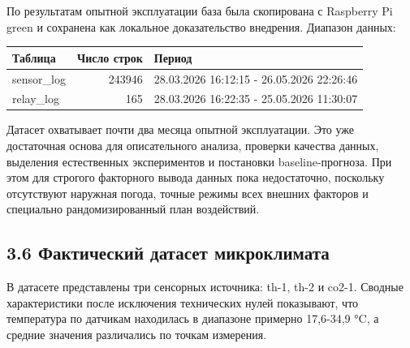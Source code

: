 \documentclass[a4paper,14pt]{extarticle}
\renewcommand{\texttt}[1]{\textnormal{#1}}
\newcounter{none}
\begin{document}
По результатам опытной эксплуатации база была скопирована с Raspberry Pi
\texttt{green} и сохранена как локальное доказательство внедрения.
Диапазон данных:

{\def\LTcaptype{none} %
\begin{longtable}[]{@{}lrl@{}}
\hline
Таблица & Число строк & Период \\
\hline
\endhead
\hline
\endlastfoot
\texttt{sensor\_log} & 243946 & 28.03.2026 16:12:15 - 26.05.2026
22:26:46 \\
\texttt{relay\_log} & 165 & 28.03.2026 16:22:35 - 25.05.2026 11:30:07 \\
\end{longtable}
}

Датасет охватывает почти два месяца опытной эксплуатации. Это уже
достаточная основа для описательного анализа, проверки качества данных,
выделения естественных экспериментов и постановки baseline-прогноза. При
этом для строгого факторного вывода данных пока недостаточно, поскольку
отсутствуют наружная погода, точные режимы всех внешних факторов и
специально рандомизированный план воздействий.

\subsection{3.6 Фактический датасет
микроклимата}\label{ux444ux430ux43aux442ux438ux447ux435ux441ux43aux438ux439-ux434ux430ux442ux430ux441ux435ux442-ux43cux438ux43aux440ux43eux43aux43bux438ux43cux430ux442ux430}

В датасете представлены три сенсорных источника: \texttt{th-1},
\texttt{th-2} и \texttt{co2-1}. Сводные характеристики после исключения
технических нулей показывают, что температура по датчикам находилась в
диапазоне примерно 17,6-34,9 °C, а средние значения различались по
точкам измерения.
\end{document}
